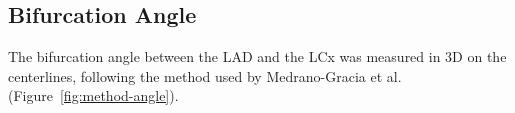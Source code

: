 \subsection{Bifurcation Angle}
\label{sec:method-angle}

The bifurcation angle between the LAD and the LCx was measured in 3D on the centerlines, following the method used by Medrano-Gracia et al.\ \cite{medranogracia2016atlas} (Figure~\ref{fig:method-angle}).


